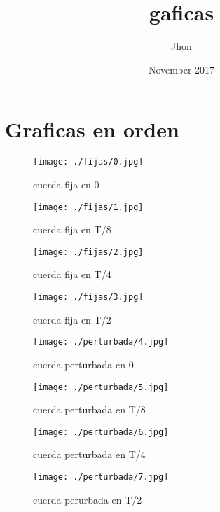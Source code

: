 \documentclass{article}
\title{gaficas}
\author{Jhon}
\date{November 2017}
\begin{document}
\maketitle

\section{Graficas en orden }


\begin{figure}[hf!]
\centering
\texttt{[image: ./fijas/0.jpg]}
\caption{cuerda fija en 0 }
\label{fig:1}
\end{figure}

\begin{figure}[hf!]
\centering
\texttt{[image: ./fijas/1.jpg]}
\caption{cuerda fija en T/8 }
\label{fig:2}
\end{figure}

\begin{figure}[hf!]
\centering
\texttt{[image: ./fijas/2.jpg]}
\caption{cuerda fija en T/4 }
\label{fig:3}
\end{figure}

\begin{figure}[hf!]
\centering
\texttt{[image: ./fijas/3.jpg]}
\caption{cuerda fija en T/2 }
\label{fig:4}
\end{figure}

\begin{figure}[hf!]
\centering
\texttt{[image: ./perturbada/4.jpg]}
\caption{cuerda perturbada en 0 }
\label{fig:5}
\end{figure}

\begin{figure}[hf!]
\centering
\texttt{[image: ./perturbada/5.jpg]}
\caption{cuerda perturbada en T/8 }
\label{fig:6}
\end{figure}

\begin{figure}[hf!]
\centering
\texttt{[image: ./perturbada/6.jpg]}
\caption{cuerda perturbada en T/4 }
\label{fig:7}
\end{figure}

\begin{figure}[hf!]
\centering
\texttt{[image: ./perturbada/7.jpg]}
\caption{cuerda perurbada en T/2 }
\label{fig:8}
\end{figure}








\end{document}
